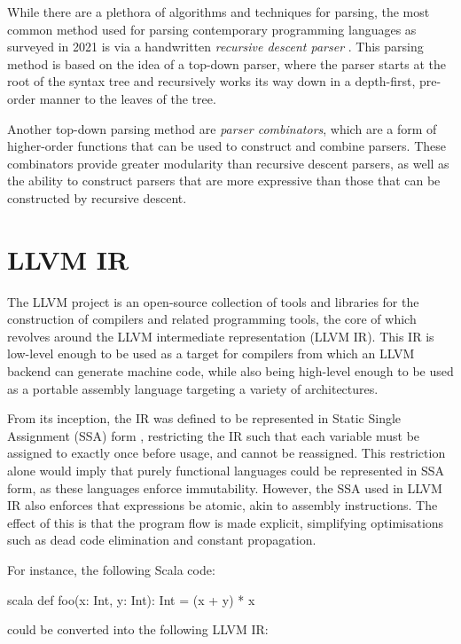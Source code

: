 While there are a plethora of algorithms and techniques for parsing, the most common method used for
parsing contemporary programming languages as surveyed in 2021 is via a handwritten \emph{recursive
    descent parser} \autocite{eaton2021parser}. This parsing method is based on the idea of a top-down
parser, where the parser starts at the root of the syntax tree and recursively works its way down in
a depth-first, pre-order manner to the leaves of the tree.

Another top-down parsing method are \emph{parser combinators}, which are a form of higher-order
functions that can be used to construct and combine parsers. These combinators provide greater
modularity than recursive descent parsers, as well as the ability to construct parsers that are more
expressive than those that can be constructed by recursive descent.


% 

\section{LLVM IR}

The LLVM project is an open-source collection of tools and libraries for the construction of
compilers and related programming tools, the core of which revolves around the LLVM intermediate
representation (LLVM IR). This IR is low-level enough to be used as a target for compilers from
which an LLVM backend can generate machine code, while also being high-level enough to be used as a
portable assembly language targeting a variety of architectures.

From its inception, the IR was defined to be represented in Static Single Assignment (SSA) form
\autocite{lattner2004llvm}, restricting the IR such that each variable must be assigned to exactly
once before usage, and cannot be reassigned. This restriction alone would imply that purely
functional languages could be represented in SSA form, as these languages enforce immutability.
However, the SSA used in LLVM IR also enforces that expressions be atomic, akin to assembly
instructions. The effect of this is that the program flow is made explicit, simplifying
optimisations such as dead code elimination and constant propagation.

For instance, the following Scala code:

\begin{code}{scala}
    def foo(x: Int, y: Int): Int = (x + y) * x
\end{code}

could be converted into the following LLVM IR:

